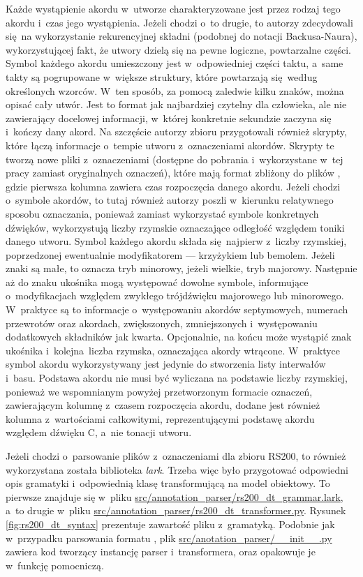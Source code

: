 Każde wystąpienie akordu w~utworze charakteryzowane jest przez rodzaj tego akordu i~czas jego wystąpienia. Jeżeli chodzi o~to drugie, to autorzy zdecydowali się na wykorzystanie rekurencyjnej składni (podobnej do notacji Backusa-Naura), wykorzystującej fakt, że utwory dzielą się na pewne logiczne, powtarzalne części. Symbol każdego akordu umieszczony jest w~odpowiedniej części taktu, a~same takty są pogrupowane w~większe struktury, które powtarzają się według określonych wzorców. W~ten sposób, za pomocą zaledwie kilku znaków, można opisać cały utwór. Jest to format jak najbardziej czytelny dla człowieka, ale nie zawierający docelowej informacji, w~której konkretnie sekundzie zaczyna się i~kończy dany akord. Na szczęście autorzy zbioru przygotowali również skrypty, które łączą informacje o~tempie utworu z~oznaczeniami akordów. Skrypty te tworzą nowe pliki z~oznaczeniami (dostępne do pobrania i~wykorzystane w~tej pracy zamiast oryginalnych oznaczeń), które mają format zbliżony do plików , gdzie pierwsza kolumna zawiera czas rozpoczęcia danego akordu. Jeżeli chodzi o~symbole akordów, to tutaj również autorzy poszli w~kierunku relatywnego sposobu oznaczania, ponieważ zamiast wykorzystać symbole konkretnych dźwięków, wykorzystują liczby rzymskie oznaczające odległość względem toniki danego utworu.  Symbol każdego akordu składa się najpierw z~liczby rzymskiej, poprzedzonej ewentualnie modyfikatorem --- krzyżykiem lub bemolem. Jeżeli znaki są małe, to oznacza tryb minorowy, jeżeli wielkie, tryb majorowy. Następnie aż do znaku ukośnika mogą występować dowolne symbole, informujące o~modyfikacjach względem zwykłego trójdźwięku majorowego lub minorowego. W~praktyce są to informacje o~występowaniu akordów septymowych, numerach przewrotów oraz akordach, zwiększonych, zmniejszonych i~występowaniu dodatkowych składników jak kwarta. Opcjonalnie, na końcu może wystąpić znak ukośnika i~kolejna liczba rzymska, oznaczająca akordy wtrącone. W~praktyce symbol akordu wykorzystywany jest jedynie do stworzenia listy interwałów i~basu.  Podstawa akordu nie musi być wyliczana na podstawie liczby rzymskiej, ponieważ we wspomnianym powyżej przetworzonym formacie oznaczeń, zawierającym kolumnę z~czasem rozpoczęcia akordu, dodane jest również kolumna z~wartościami całkowitymi, reprezentującymi podstawę akordu względem dźwięku C, a~nie tonacji utworu.

Jeżeli chodzi o~parsowanie plików z~oznaczeniami dla zbioru RS200, to również wykorzystana została biblioteka \emph{lark}. Trzeba więc było przygotować odpowiedni opis gramatyki i~odpowiednią klasę transformującą na model obiektowy. To pierwsze znajduje się w~pliku \url{src/annotation_parser/rs200_dt_grammar.lark}, a~to drugie w~pliku \url{src/annotation_parser/rs200_dt_transformer.py}. Rysunek \ref{fig:rs200_dt_syntax} prezentuje zawartość pliku z~gramatyką. Podobnie jak w~przypadku parsowania formatu , plik \url{src/anotation_parser/__init__.py} zawiera kod tworzący instancję parser i~transformera, oraz opakowuje je w~funkcję pomocniczą.


